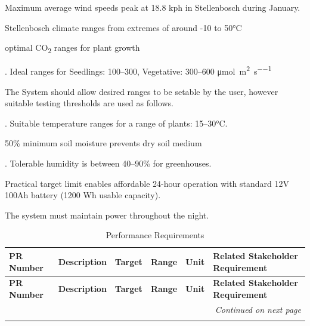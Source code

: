 \begin{ThreePartTable}
	\begin{TableNotes}
		\footnotesize
		\item[1] \citep{weatherStellenbosch2024} Maximum average wind speeds peak at 18.8 kph in Stellenbosch during January.
		\item[2] \citep{weatherStellenbosch2024} Stellenbosch climate ranges from extremes of around -10 to 50°C
		\item[3] \cite{carbon_dioxide_enrichment} optimal CO\textsubscript{2} ranges for plant growth
		\item[4] \citep{definitiveGrowLight2024}. Ideal ranges for Seedlings: 100–300, Vegetative: 300–600 \si{\micro\mole\per\metre\squared\per\second}
		\item[5] The System should allow desired ranges to be setable by the user, however suitable testing thresholds are used as follows.
		\item[6] \citep{kosan2020}. Suitable temperature ranges for a range of plants: 15–30°C.
		\item[7] 50\% minimum soil moisture prevents dry soil medium
		\item[8] \citep{Wei2024}. Tolerable humidity is between 40–90\% for greenhouses.
		\item[9] Practical target limit enables affordable 24-hour operation with standard 12V 100Ah battery (1200 Wh usable capacity).
		\item[10] The system must maintain power throughout the night.
	\end{TableNotes}
	
	\begin{longtable}{|p{1.5cm}|p{4.5cm}|c|c|c|p{2.5cm}|}
		\caption{Performance Requirements}\label{tab:performance_requirements}\\
		\hline
		\textbf{PR Number} & \textbf{Description} & \textbf{Target} & \textbf{Range} & \textbf{Unit} & \textbf{Related Stakeholder Requirement} \\
		\hline
		\endfirsthead
		
		\hline
		\textbf{PR Number} & \textbf{Description} & \textbf{Target} & \textbf{Range} & \textbf{Unit} & \textbf{Related Stakeholder Requirement} \\
		\hline
		\endhead
		
		\hline
		\multicolumn{6}{r}{\emph{Continued on next page}}\\
		\endfoot
		
		\hline
		\insertTableNotes
		\endlastfoot
		

\end{longtable}
\end{ThreePartTable}

